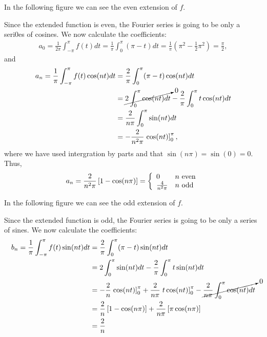 \begin{questions}

\begin{solution}
In the following figure we can see the even extension of $f$. 

Since the extended function is even, the Fourier series is going to be only a seri0es of cosines. We now calculate the coefficients:
\begin{align*}
a_0=\frac{1}{2\pi}\int_{-\pi}^{\pi}f(t)dt=\frac{1}{\pi}\int_{0}^{\pi}(\pi-t)dt=\frac{1}{\pi}\left(\pi^2-\frac{1}{2} \pi^2\right)=\frac{\pi}{2},
\end{align*}
and
\begin{align*}
a_n=\frac{1}{\pi}\int_{-\pi}^{\pi}f(t)\cos(nt)dt&=\frac{2}{\pi}\int_{0}^{\pi}(\pi-t)\cos(nt)dt\\
&=\cancelto{0}{2\int_{0}^{\pi}\cos(nt)dt}-\frac{2}{\pi}\int_{0}^{\pi}t\cos(nt)dt\\
&=\frac{2}{n\pi}\int_{0}^{\pi}\sin(nt)dt\\
&=-\frac{2}{n^2\pi}\left.\cos(nt)\right]_0^{\pi},
\end{align*}
where we have used intergration by parts and that $\sin(n\pi)=\sin(0)=0$. Thus,
\begin{align*}
a_n=\frac{2}{n^2\pi}\left[1-\cos(n\pi)\right]= \left\{
\begin{array}{ll}
      0 & n $ even$ \\
      \frac{4}{n^2\pi} & n $ odd$ \\
\end{array} 
\right.
\end{align*}
\end{solution}
\begin{solution}
In the following figure we can see the odd extension of $f$. 

Since the extended function is odd, the Fourier series is going to be only a series of sines. We now calculate the coefficients:
\begin{align*}
b_n=\frac{1}{\pi}\int_{-\pi}^{\pi}f(t)\sin(nt)dt&=\frac{2}{\pi}\int_{0}^{\pi}(\pi-t)\sin(nt)dt\\
&=2\int_{0}^{\pi}\sin(nt)dt-\frac{2}{\pi}\int_{0}^{\pi}t\sin(nt)dt\\
&=-\frac{2}{n}\left.\cos(nt)\right]_0^{\pi}+\frac{2}{n\pi}\left.t\cos(nt)\right]_0^{\pi}-\cancelto{0}{\frac{2}{n\pi}\int_0^{\pi}\cos(nt)dt}\\
&=\frac{2}{n}\left[1-\cos(n\pi)\right]+\frac{2}{n\pi}\left[\pi\cos(n\pi)\right]\\
&=\frac{2}{n}
\end{align*}


\end{solution}
\end{questions}
